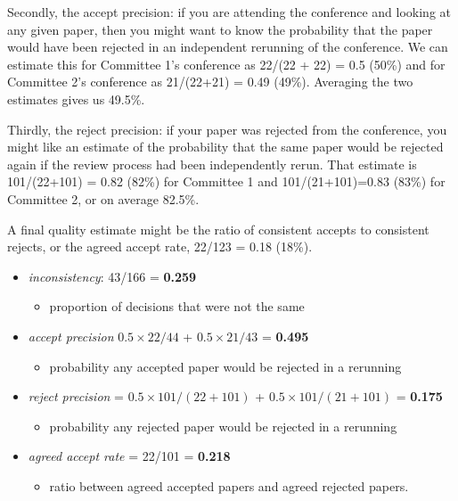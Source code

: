 Secondly, the accept precision: if you are
attending the conference and looking at any given paper, then you might
want to know the probability that the paper would have been rejected in
an independent rerunning of the conference. We can estimate this for
Committee 1's conference as 22/(22 + 22) = 0.5 (50\%) and for Committee
2's conference as 21/(22+21) = 0.49 (49\%). Averaging the two estimates
gives us 49.5\%. 

Thirdly, the reject precision: if your paper was
rejected from the conference, you might like an estimate of the
probability that the same paper would be rejected again if the review
process had been independently rerun. That estimate is 101/(22+101) =
0.82 (82\%) for Committee 1 and 101/(21+101)=0.83 (83\%) for Committee
2, or on average 82.5\%. 

A final quality estimate might be the ratio of
consistent accepts to consistent rejects, or the agreed accept rate,
22/123 = 0.18 (18\%).

\begin{itemize}
\tightlist
\item
  \emph{inconsistency}: 43/166 = \textbf{0.259}

  \begin{itemize}
  \tightlist
  \item
    proportion of decisions that were not the same
  \end{itemize}
\item
  \emph{accept precision} \(0.5 \times 22/44\) + \(0.5 \times 21/43\) =
  \textbf{0.495}

  \begin{itemize}
  \tightlist
  \item
    probability any accepted paper would be rejected in a rerunning
  \end{itemize}
\item
  \emph{reject precision} = \(0.5\times 101/(22+101)\) +
  \(0.5\times 101/(21 + 101)\) = \textbf{0.175}

  \begin{itemize}
  \tightlist
  \item
    probability any rejected paper would be rejected in a rerunning
  \end{itemize}
\item
  \emph{agreed accept rate} = 22/101 = \textbf{0.218}
  \begin{itemize}
    \item
  ratio between agreed accepted papers and agreed rejected papers.
  \end{itemize}
\end{itemize}

